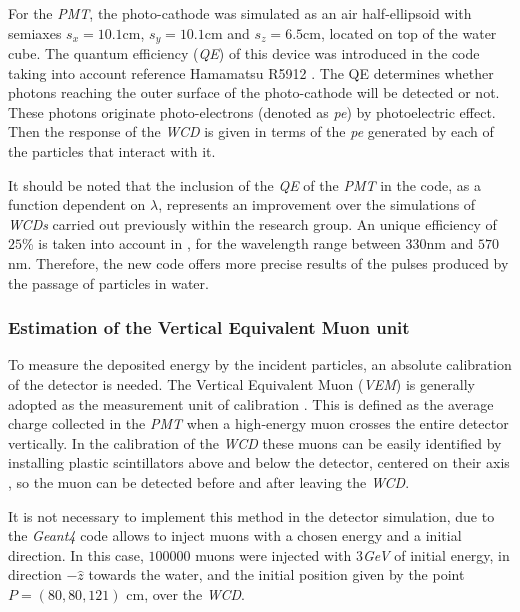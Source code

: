 \documentclass[submitting]{nst}
\begin{document}
For the \textsl{PMT}, the photo-cathode was simulated as an air half-ellipsoid with semiaxes $s_x=10.1$cm, $ s_y = 10.1$cm and $s_z=6.5$cm, located on top of the water cube. The quantum efficiency (\textsl{QE}) of this device was introduced in the code taking into account reference Hamamatsu R5912 \cite{Hamamatsu2018}. The QE determines whether photons reaching the outer surface of the photo-cathode will be detected or not. These photons originate photo-electrons (denoted as \textsl{pe}) by photoelectric effect. Then the response of the \textsl{WCD} is given in terms of the \textsl{pe} generated by each of the particles that interact with it.

It should be noted that the inclusion of the \textsl{QE} of the \textsl{PMT} in the code, as a function dependent on $\lambda$, represents an improvement over the simulations of \textsl{WCDs} carried out previously within the research group. An unique efficiency of $25$\% is taken into account in \cite{CalderonAsoreyNunez2015}, for the wavelength range between $330$nm and $570$nm. Therefore, the new code offers more precise results of the pulses produced by the passage of particles in water. 
 
 \subsubsection{Estimation of the Vertical Equivalent Muon unit}
 To measure the deposited energy by the incident particles, an absolute calibration of the detector is needed. The Vertical Equivalent Muon (\textsl{VEM}) is generally adopted as the measurement unit of calibration \cite{EtchegoyenEtal2005}. This is defined as the average charge collected in the \textsl{PMT} when a high-energy muon crosses the entire detector vertically. In the calibration of the \textsl{WCD} these muons can be easily identified by installing plastic scintillators above and below the detector, centered on their axis \cite{EtchegoyenEtal2005}, so the muon can be detected before and after leaving the \textsl{WCD}.
 
It is not necessary to implement this method in the detector simulation, due to the \textsl{Geant4} code allows to inject muons with a chosen energy and a initial direction. In this case, $100000$ muons were injected with $3$\textsl{GeV}   of initial energy, in direction $-\hat{z}$ towards the water, and the initial position given by the point $ P=(80, 80, 121)$ cm, over the \textsl{WCD}. 
\end{document}
